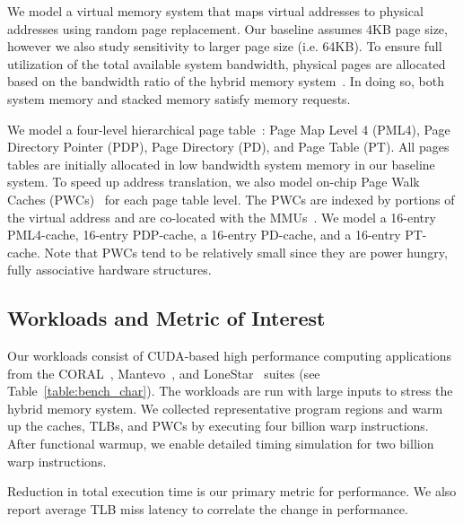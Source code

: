 
We model a virtual memory system that maps virtual addresses to
physical addresses using random page replacement.  Our baseline
assumes 4KB page size, however we also study sensitivity to larger
page size (i.e. 64KB). To ensure full utilization of the total
available system bandwidth, physical pages are allocated based on the
bandwidth ratio of the hybrid memory system~\cite{bwa,batman}. In
doing so, both system memory and stacked memory satisfy memory
requests.

We model a four-level hierarchical page table~\cite{SkipPT}: Page Map
Level 4 (PML4), Page Directory Pointer (PDP), Page Directory (PD), and
Page Table (PT). All pages tables are initially allocated in low
bandwidth system memory in our baseline system. To speed up address
translation, we also model on-chip Page Walk Caches
(PWCs)~\cite{SkipPT, MMUcaches} for each page table level. The PWCs
are indexed by portions of the virtual address and are co-located with
the MMUs~\cite{MMUcaches}. We model a 16-entry PML4-cache, 16-entry
PDP-cache, a 16-entry PD-cache, and a 16-entry
PT-cache\cite{MMUcaches}. Note that PWCs tend to be relatively small
since they are power hungry, fully associative hardware structures.

\subsection{Workloads and Metric of Interest}

\noindent Our workloads consist of CUDA-based high performance
computing applications from the CORAL~\cite{CORAL},
Mantevo~\cite{mantevo}, and LoneStar~\cite{lonestar} suites (see
Table~\ref{table:bench_char}). The workloads are run with large inputs
to stress the hybrid memory system. We collected representative
program regions and warm up the caches, TLBs, and PWCs by
executing four billion warp instructions. After functional warmup, we
enable detailed timing simulation for two billion warp instructions.

Reduction in total execution time is our primary metric for
performance. We also report average TLB miss latency to correlate the
change in performance.

